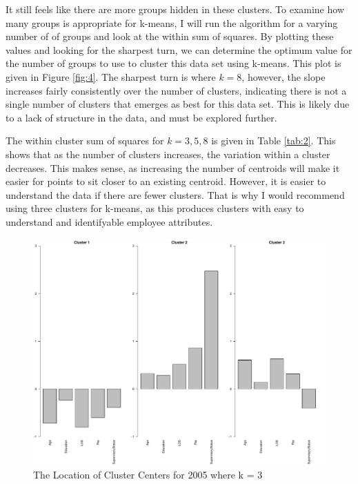 \documentclass{article}
\begin{document}
    \par
    It still feels like there are more groups hidden in these clusters. To examine how many groups is appropriate for k-means, I will run the algorithm for a varying number of of groups and look at the within sum of squares. By plotting these values and looking for the sharpest turn, we can determine the optimum value for the number of groups to use to cluster this data set using k-means. This plot is given in Figure \ref{fig:4}. The sharpest turn is where $k = 8$, however, the slope increases fairly consistently over the number of clusters, indicating there is not a single number of clusters that emerges as best for this data set. This is likely due to a lack of structure in the data, and must be explored further.
    \par
    The within cluster sum of squares for $k = 3, 5, 8$ is given in Table \ref{tab:2}. This shows that as the number of clusters increases, the variation within a cluster decreases. This makes sense, as increasing the number of centroids will make it easier for points to sit closer to an existing centroid. However, it is easier to understand the data if there are fewer clusters. That is why I would recommend using three clusters for k-means, as this produces clusters with easy to understand and identifyable employee attributes.

    \begin{center}
        \begin{figure}
            \includegraphics[scale=0.4]{./images/3-cluster-center-2005.pdf}
            \caption{The Location of Cluster Centers for 2005 where k = 3}
            \label{fig:1}
        \end{figure}
    \end{center}
\end{document}
